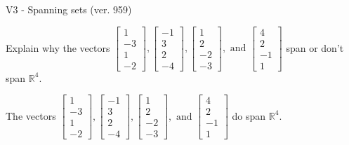 \begin{exercise}
  \begin{exerciseTitle}V3 - Spanning sets (ver. 959)\end{exerciseTitle}
  \begin{exerciseStatement}
    Explain why the vectors \(\left[\begin{array}{r}
1 \\
-3 \\
1 \\
-2
\end{array}\right] , \left[\begin{array}{r}
-1 \\
3 \\
2 \\
-4
\end{array}\right] , \left[\begin{array}{r}
1 \\
2 \\
-2 \\
-3
\end{array}\right] , \text{ and } \left[\begin{array}{r}
4 \\
2 \\
-1 \\
1
\end{array}\right]\) span or don't span \(\mathbb{R}^4\). 
	


  \end{exerciseStatement}
  \begin{exerciseAnswer}
   The vectors \(\left[\begin{array}{r}
1 \\
-3 \\
1 \\
-2
\end{array}\right] , \left[\begin{array}{r}
-1 \\
3 \\
2 \\
-4
\end{array}\right] , \left[\begin{array}{r}
1 \\
2 \\
-2 \\
-3
\end{array}\right] , \text{ and } \left[\begin{array}{r}
4 \\
2 \\
-1 \\
1
\end{array}\right]\) 
  	 do  
	span \(\mathbb{R}^4\).
  


  \end{exerciseAnswer}
\end{exercise}